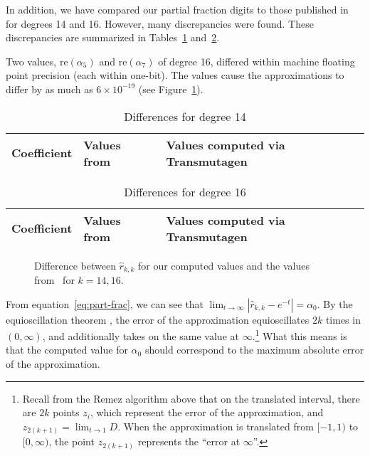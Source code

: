 
In addition, we have compared our partial fraction digits to those published
in~\cite{pusa2012correction} for degrees 14 and 16. However, many
discrepancies were found. These discrepancies are summarized in
Tables~\ref{table:pusa-degree-14} and~\ref{table:pusa-degree-16}.

Two values, $\mathrm{re}(\alpha_5)$ and $\mathrm{re}(\alpha_7)$ of degree 16,
differed within machine floating point precision (each within one-bit). The
values cause the approximations to differ by as much as $6\times10^{-19}$ (see
Figure~\ref{fig:pusa-differences}).

\setul{}{1pt}

\begin{table}[h!]
\centering
\begin{tabular}{ r l l }
Coefficient & Values from~\cite{pusa2012correction} & Values computed via Transmutagen \\
\hline

\end{tabular}
\caption{Differences for degree 14}
\label{table:pusa-degree-14}
\end{table}

\begin{table}[h!]
\centering
\begin{tabular}{ r l l }
Coefficient & Values from~\cite{pusa2012correction} & Values computed via Transmutagen \\
\hline

\end{tabular}
\caption{Differences for degree 16}
\label{table:pusa-degree-16}
\end{table}

\begin{figure}[!ht]
\centering
\resizebox{0.9\textwidth}{!}{}
\caption{Difference between $\hat{r}_{k,k}$ for our computed values and the
  values from~ for $k=14,16$.}
\label{fig:pusa-differences}
\end{figure}

From equation~\ref{eq:part-frac}, we can see that
$\lim_{t\to\infty}{\left|\hat{r}_{k,k} - e^{-t}\right|} = \alpha_0$. By the
equioscillation theorem , the error of the approximation equioscillates $2k$ times
in $(0, \infty)$, and additionally takes on the same value at $\infty$.\footnote{Recall
from the Remez algorithm above that on the translated interval, there are $2k$
points $z_i$, which represent the error of the approximation, and
$z_{2(k+1)}=\lim_{t\to 1}{D}$. When the approximation is translated from $[-1,
1)$ to $[0, \infty)$, the point $z_{2(k + 1)}$ represents the ``error at
$\infty$''.} What this means is that the computed value for $\alpha_0$ should
correspond to the maximum absolute error of the approximation.

